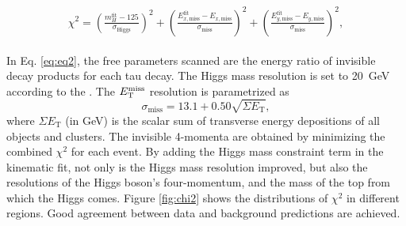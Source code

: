 \begin{eqnarray}
\begin{array}{ll}
\chi^2 = 
\left( \frac{m_{H}^{\text{fit}} - 125}{\sigma_{\text{Higgs}}} \right)^2 + \left( \frac{E_{x,\text{miss}}^{\text{fit}} - E_{x,\text{miss}}}{\sigma_{\text{miss}}} \right)^2 + \left( \frac{E_{y,\text{miss}}^{\text{fit}} - E_{y,\text{miss}}}{\sigma_{\text{miss}}} \right)^2 ,
\end{array}
\label{eq:eq2}
\end{eqnarray}

%

In Eq. \ref{eq:eq2}, the free parameters scanned are the energy ratio of invisible decay products for each tau decay.
The Higgs mass resolution is set to 20~GeV according to the \cite{Htautau}. The $E_{\text{T}}^{\text{miss}}$ resolution is parametrized as
\begin{equation}
\sigma_{\text{miss}}=13.1 + 0.50\sqrt{\Sigma E_\text{T}},
\label{eq:eq7}
\end{equation}
where $\Sigma E_\text{T}$ (in GeV) is the scalar sum of transverse energy depositions of all objects and clusters. The invisible 4-momenta are obtained by minimizing the combined $\chi^2$ for each event. By adding the Higgs mass constraint term in the kinematic fit, not only is the Higgs mass resolution improved, but also the resolutions of the Higgs boson's four-momentum, and the mass of the top from which the Higgs comes. Figure \ref{fig:chi2} shows the distributions of $\chi^2$ in different regions. Good agreement between data and background predictions are achieved.

